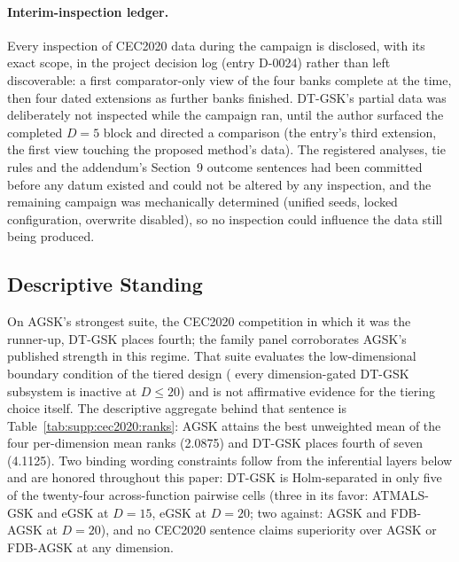 \documentclass[algorithms,article,submit,moreauthors,pdftex]{Definitions/mdpi}
\newcommand{\dtgsk}{DT-GSK}
\newcommand{\atmals}{ATMALS-GSK}
\newcommand{\agsk}{AGSK}
\newcommand{\fdbagsk}{FDB-AGSK}
\newcommand{\egsk}{eGSK}
\begin{document}
\paragraph{Interim-inspection ledger.}
Every inspection of CEC2020 data during the campaign is disclosed, with
its exact scope, in the project decision log (entry D-0024) rather than
left discoverable: a first comparator-only view of the four banks complete
at the time, then four dated extensions as further banks finished.
\dtgsk{}'s partial data was deliberately not inspected while the campaign
ran, until the author surfaced the completed $D = 5$ block and directed a
comparison (the entry's third extension, the first view touching the
proposed method's data).  The registered analyses, tie rules and the
addendum's Section~9 outcome sentences had been committed before any datum existed
and could not be altered by any inspection, and the remaining campaign was
mechanically determined (unified seeds, locked configuration, overwrite
disabled), so no inspection could influence the data still being
produced.

\subsection{Descriptive Standing}\label{sec:supp:cec2020:standing}

On AGSK's strongest suite, the CEC2020 competition in which it was
the runner-up, \dtgsk{} places fourth; the family
panel corroborates AGSK's published strength in this regime.  That suite
evaluates the low-dimensional boundary condition of the tiered design (%
every dimension-gated \dtgsk{} subsystem is inactive at $D \le 20$)
and is not affirmative evidence for the tiering choice itself.
The descriptive aggregate behind that sentence is
Table~\ref{tab:supp:cec2020:ranks}: \agsk{} attains the best unweighted
mean of the four per-dimension mean ranks (2.0875) and \dtgsk{} places
fourth of seven (4.1125).  Two binding wording constraints follow from the
inferential layers below and are honored throughout this paper: \dtgsk{}
is Holm-separated in only five of the twenty-four across-function pairwise
cells (three in its favor: \atmals{} and \egsk{} at $D = 15$,
\egsk{} at $D = 20$; two against: \agsk{} and \fdbagsk{} at
$D = 20$), and no CEC2020 sentence claims superiority over \agsk{} or
\fdbagsk{} at any dimension.
\end{document}
